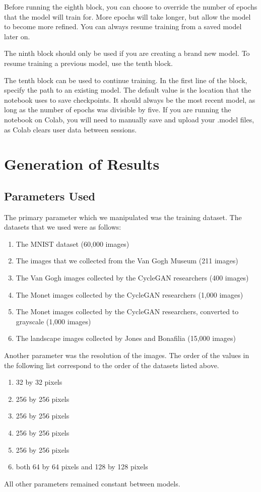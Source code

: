 \documentclass[12pt,letterpaper]{article}
\begin{document}
		Before running the eighth block, you can choose to override the number of epochs that the model will train for.
		More epochs will take longer, but allow the model to become more refined.
		You can always resume training from a saved model later on.

		The ninth block should only be used if you are creating a brand new model.
		To resume training a previous model, use the tenth block.

		The tenth block can be used to continue training.
		In the first line of the block, specify the path to an existing model.
		The default value is the location that the notebook uses to save checkpoints.
		It should always be the most recent model, as long as the number of epochs was divisible by five.
		If you are running the notebook on Colab, you will need to manually save and upload your .model files, as Colab clears user data between sessions.

	\section{Generation of Results}
		\subsection{Parameters Used}
			The primary parameter which we manipulated was the training dataset.
			The datasets that we used were as follows:
			\begin{enumerate}
				\item The MNIST dataset (60,000 images)
				\item The images that we collected from the Van Gogh Museum (211 images)
				\item The Van Gogh images collected by the CycleGAN researchers (400 images)
				\item The Monet images collected by the CycleGAN researchers (1,000 images)
				\item The Monet images collected by the CycleGAN researchers, converted to grayscale (1,000 images)
				\item The landscape images collected by Jones and Bonafilia\cite{otherGanGogh} (15,000 images)
			\end{enumerate}
			Another parameter was the resolution of the images.
			The order of the values in the following list correspond to the order of the datasets listed above.
			\begin{enumerate}
				\item 32 by 32 pixels
				\item 256 by 256 pixels
				\item 256 by 256 pixels
				\item 256 by 256 pixels
				\item 256 by 256 pixels
				\item both 64 by 64 pixels and 128 by 128 pixels
			\end{enumerate}
			All other parameters remained constant between models.
\end{document}
